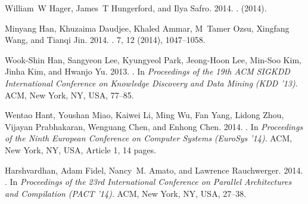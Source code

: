 \documentclass[reprint,twocolumn,showpacs,preprintnumbers,amsmath, aps,pre,amssymb]{revtex4-1}
\begin{document}
\begin{thebibliography}{00}
{
{William~W Hager}, {James~T Hungerford}, {and} {Ilya Safro}. 2014.
\newblock {}.
 (2014).
\newblock
{}


{Minyang Han}, {Khuzaima Daudjee}, {Khaled Ammar}, {M~Tamer Ozsu}, {Xingfang
  Wang}, {and} {Tianqi Jin}. 2014.
\newblock {}.
 {7}, 12 (2014), 1047--1058.
\newblock


{Wook-Shin Han}, {Sangyeon Lee}, {Kyungyeol Park}, {Jeong-Hoon Lee}, {Min-Soo
  Kim}, {Jinha Kim}, {and} {Hwanjo Yu}. 2013.
\newblock {}. In {\em Proceedings of the 19th ACM
  SIGKDD International Conference on Knowledge Discovery and Data Mining} {\em
  (KDD '13)}. ACM, New York, NY, USA, 77--85.
\newblock
{}


{Wentao Hant}, {Youshan Miao}, {Kaiwei Li}, {Ming Wu}, {Fan Yang}, {Lidong
  Zhou}, {Vijayan Prabhakaran}, {Wenguang Chen}, {and} {Enhong Chen}. 2014.
\newblock {}. In {\em Proceedings of the Ninth European Conference on Computer
  Systems} {\em (EuroSys '14)}. ACM, New York, NY, USA, Article 1, 14 pages.
\newblock
{}


{Harshvardhan}, {Adam Fidel}, {Nancy~M. Amato}, {and} {Lawrence Rauchwerger}.
  2014.
\newblock {}. In {\em Proceedings of the 23rd International Conference on
  Parallel Architectures and Compilation} {\em (PACT '14)}. ACM, New York, NY,
  USA, 27--38.
\newblock
{}


}
\end{thebibliography}
\end{document}

